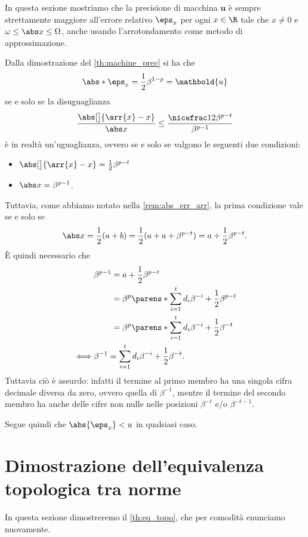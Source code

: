 In questa sezione mostriamo che la precisione di macchina $\mathbold{u}$ è sempre strettamente maggiore all'errore relativo $\eps_x$ per ogni $x \in \R$ tale che $x \neq 0$ e $\omega \leq \abs x \leq \Omega$, anche usando l'arrotondamento come metodo di approssimazione.

Dalla dimostrazione del \autoref{th:machine_prec} si ha che \[
    \abs*{\eps_x} = \frac12\beta^{1-p} = \mathbold{u}
\] se e solo se la disuguaglianza \[
    \frac{\abs[\big]{\arr{x} - x}}{\abs x} 
    \leq \frac{\nicefrac12\beta^{p-t}}{\beta^{p-1}}
\] è in realtà un'uguaglianza, ovvero se e solo se valgono le seguenti due condizioni:
\begin{itemize}
    \item $\abs[\big]{\arr{x} - x} = \frac12\beta^{p-t}$
    \item $\abs x = \beta^{p-1}$.
\end{itemize}
Tuttavia, come abbiamo notato nella \autoref{rem:abs_err_arr}, la prima condizione vale se e solo se \[
    \abs x = \frac12(a+b) = \frac12(a + a + \beta^{p-t}) = a + \frac12\beta^{p-t}.
\] È quindi necessario che \begin{align*}
    &\beta^{p-1} 
        \begin{aligned}[t] 
            &= a + \frac12\beta^{p-t} \\
            &= \beta^p \parens*{\sum_{i=1}^t d_i\beta^{-i}} + \frac12\beta^{p-t} \\
            &= \beta^p \parens*{\sum_{i=1}^t d_i\beta^{-i} + \frac12\beta^{-t}}
        \end{aligned} \\
    \iff &\beta^{-1} = \sum_{i=1}^t d_i\beta^{-i} + \frac12\beta^{-t}.
\end{align*} Tuttavia ciò è assurdo: infatti il termine al primo membro ha una singola cifra decimale diversa da zero, ovvero quella di $\beta^{-1}$, mentre il termine del secondo membro ha anche delle cifre non nulle nelle posizioni $\beta^{-t}$ e/o $\beta^{-t-1}$.  

Segue quindi che $\abs{\eps_x} < u$ in qualsiasi caso.

\section{Dimostrazione dell'equivalenza topologica tra norme}
\label{sec:eq_topo_norm}

In questa sezione dimostreremo il \autoref{th:eq_topo}, che per comodità enunciamo nuovamente.

